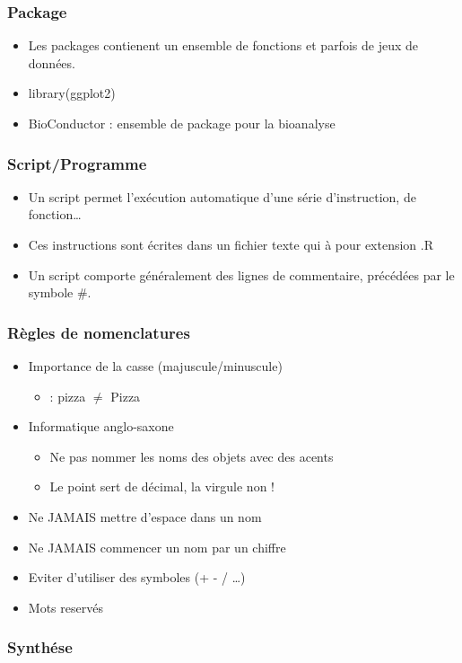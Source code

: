\documentclass[table,svgnames,hyperref={pdfpagemode=FullScreen}]{beamer}
\newcommand{\grille}{
\begin{tikzpicture}[overlay,remember picture]
	\begin{scope}[shift={(current page.south west)}]
		\draw[gray!50] (0,0) grid[step=2mm] (current page.north east);
		\draw[red!50] (0,0) grid[step=1cm] (current page.north east);
		\draw (0.2,1) node {1};
     \draw (0.2,2) node {2};
     \draw (0.2,3) node {3};
     \draw (0.2,4) node {4};
     \draw (0.2,5) node {5};
     \draw (0.2,6) node {6};
     \draw (0.2,7) node {7};
     \draw (0.2,8) node {8};
     \draw (0.2,9) node {9};
     \draw (1,0.5) node {1};
     \draw (2,0.5) node {2};
     \draw (3,0.5) node {3};
     \draw (4,0.5) node {4};
     \draw (5,0.5) node {5};
     \draw (6,0.5) node {6};
     \draw (7,0.5) node {7};
     \draw (8,0.5) node {8};
     \draw (9,0.5) node {9};
     \draw (10,0.5) node {10};
     \draw (11,0.5) node {11};
     \draw (12,0.5) node {12};
\end{scope}
\end{tikzpicture}
}
\begin{document}
	\begin{frame}
		\frametitle{Package}
		\begin{itemize}
			\item Les packages contienent un ensemble de fonctions et parfois de jeux de données.
			\item	library(ggplot2)
			\item BioConductor : ensemble de package pour la bioanalyse
		\end{itemize}
	\end{frame}
	\begin{frame}
		\setbeamercovered{dynamic}
		\frametitle{Script/Programme}
		\begin{itemize}
			\item Un script permet l'exécution automatique d'une série d'instruction, de fonction\dots
			\item Ces instructions sont écrites dans un fichier texte qui à pour extension .R
			\item Un script comporte généralement des lignes de commentaire, précédées par le symbole \#.
		\end{itemize}

		
	\end{frame}
\begin{frame}
	\frametitle{Règles de nomenclatures}
	\begin{itemize}
		\item Importance de la casse (majuscule/minuscule)
			\begin{itemize}
				\item : pizza  $\neq$ Pizza
			\end{itemize}
		\item Informatique anglo-saxone
			\begin{itemize}
				\item Ne pas nommer les noms des objets avec des acents 
				\item Le point sert de décimal, la virgule non !
			\end{itemize}
		\item Ne JAMAIS mettre d'espace dans un nom  
		\item Ne JAMAIS commencer un nom par un chiffre 
		\item Eviter d'utiliser des symboles (+ - / \dots)
		\item Mots reservés
	\end{itemize}
\end{frame}
\begin{frame}
	\frametitle{Synthése}
	\begin{center}
	
\end{center}
\end{frame}
\end{document}
